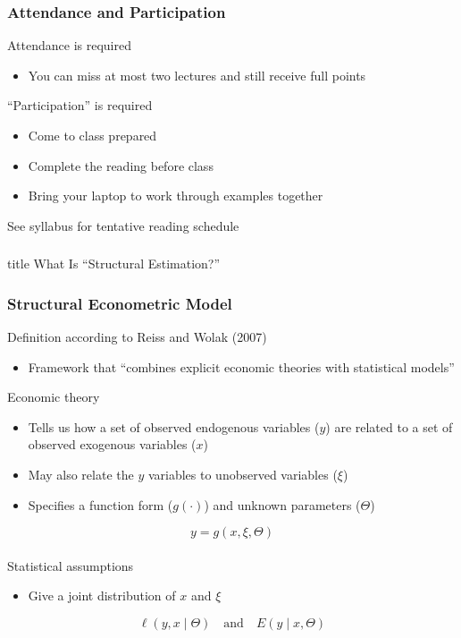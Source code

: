 \documentclass{beamer}
\begin{document}
\begin{frame}\frametitle{Attendance and Participation}
    Attendance is required
    \begin{itemize}
        \item You can miss at most two lectures and still receive full points
    \end{itemize}
    \vspace{3ex}
    ``Participation'' is required
    \begin{itemize}
        \item Come to class prepared
        \item Complete the reading before class
        \item Bring your laptop to work through examples together
    \end{itemize}
    \vspace{3ex}
    See syllabus for tentative reading schedule
\end{frame}

\begin{frame}\frametitle{}
    \vfill
    \centering
    \begin{beamercolorbox}[center]{title}
        \Large What Is ``Structural Estimation?''
    \end{beamercolorbox}
    \vfill
\end{frame}

\begin{frame}\frametitle{Structural Econometric Model}
    Definition according to Reiss and Wolak (2007)
    \begin{itemize}
        \item Framework that ``combines explicit economic theories with statistical models''
    \end{itemize}
    \vspace{1ex}
    Economic theory
    \begin{itemize}
        \item Tells us how a set of observed endogenous variables ($y$) are related to a set of observed exogenous variables ($x$)
        \item May also relate the $y$ variables to unobserved variables ($\xi$)
        \item Specifies a function form ($g(\cdot)$) and unknown parameters ($\Theta$)
    \end{itemize}
    \vspace{1ex}
    $$y = g(x, \xi, \Theta)$$ \\
    \vspace{1ex}
    Statistical assumptions
    \begin{itemize}
        \item Give a joint distribution of $x$ and $\xi$
    \end{itemize}
    \vspace{1ex}
    $$\ell(y, x \mid \Theta) \quad \text{and} \quad E(y \mid x, \Theta)$$
\end{frame}
\end{document}
